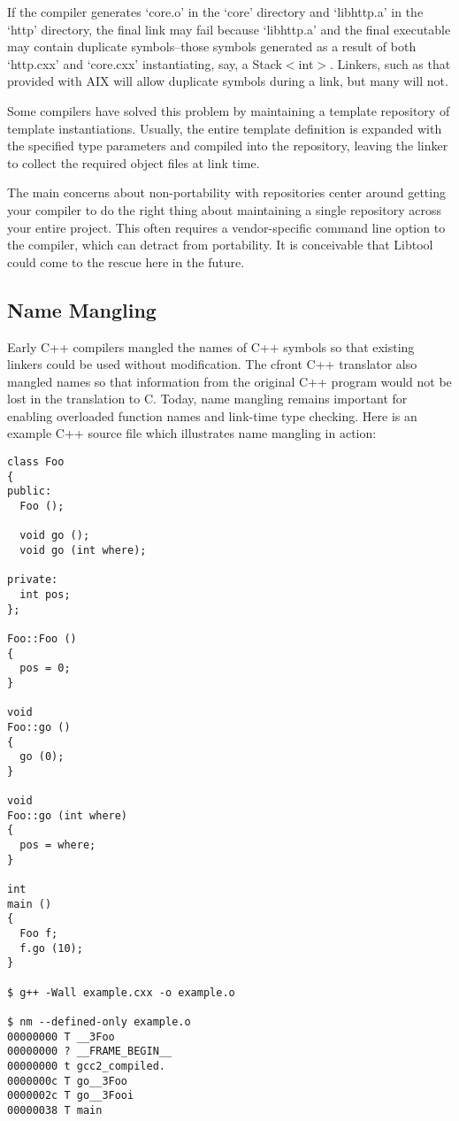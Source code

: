 If the compiler generates `core.o' in the `core' directory and `libhttp.a' in the `http' directory, the final link may fail because `libhttp.a' and the final executable may contain duplicate symbols--those symbols generated as a result of both `http.cxx' and `core.cxx' instantiating, say, a Stack$<$int$>$. Linkers, such as that provided with AIX will allow duplicate symbols during a link, but many will not.

Some compilers have solved this problem by maintaining a template repository of template instantiations. Usually, the entire template definition is expanded with the specified type parameters and compiled into the repository, leaving the linker to collect the required object files at link time.

The main concerns about non-portability with repositories center around getting your compiler to do the right thing about maintaining a single repository across your entire project. This often requires a vendor-specific command line option to the compiler, which can detract from portability. It is conceivable that Libtool could come to the rescue here in the future. 

\subsection{Name Mangling}

Early C++ compilers mangled the names of C++ symbols so that existing linkers could be used without modification. The cfront C++ translator also mangled names so that information from the original C++ program would not be lost in the translation to C. Today, name mangling remains important for enabling overloaded function names and link-time type checking. Here is an example C++ source file which illustrates name mangling in action: 

\begin{Verbatim}[frame=single]
class Foo
{
public:
  Foo ();
  
  void go ();
  void go (int where);

private:
  int pos;
};

Foo::Foo ()
{
  pos = 0;
}

void
Foo::go ()
{
  go (0);
}

void
Foo::go (int where)
{
  pos = where;
}

int
main ()
{
  Foo f;
  f.go (10);
}

$ g++ -Wall example.cxx -o example.o

$ nm --defined-only example.o
00000000 T __3Foo
00000000 ? __FRAME_BEGIN__
00000000 t gcc2_compiled.
0000000c T go__3Foo
0000002c T go__3Fooi
00000038 T main
\end{Verbatim}

